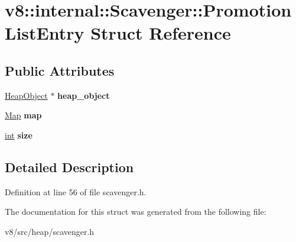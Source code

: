 \hypertarget{structv8_1_1internal_1_1Scavenger_1_1PromotionListEntry}{}\section{v8\+:\+:internal\+:\+:Scavenger\+:\+:Promotion\+List\+Entry Struct Reference}
\label{structv8_1_1internal_1_1Scavenger_1_1PromotionListEntry}
\subsection*{Public Attributes}
\begin{DoxyCompactItemize}
\item 
\mbox{\label{structv8_1_1internal_1_1Scavenger_1_1PromotionListEntry_a2f959b0c193658f7f710b33d66b8552c}} 
\mbox{\hyperlink{classv8_1_1internal_1_1HeapObject}{Heap\+Object}} $\ast$ {\bfseries heap\+\_\+object}
\item 
\mbox{\label{structv8_1_1internal_1_1Scavenger_1_1PromotionListEntry_a7bdff563645d29e13fb87905046e9477}} 
\mbox{\hyperlink{classv8_1_1internal_1_1Map}{Map}} {\bfseries map}
\item 
\mbox{\label{structv8_1_1internal_1_1Scavenger_1_1PromotionListEntry_a6383539aae7636a45920c52e566117c5}} 
\mbox{\hyperlink{classint}{int}} {\bfseries size}
\end{DoxyCompactItemize}


\subsection{Detailed Description}


Definition at line 56 of file scavenger.\+h.



The documentation for this struct was generated from the following file\+:\begin{DoxyCompactItemize}
\item 
v8/src/heap/scavenger.\+h\end{DoxyCompactItemize}
